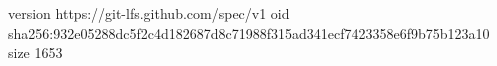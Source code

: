 version https://git-lfs.github.com/spec/v1
oid sha256:932e05288dc5f2c4d182687d8c71988f315ad341ecf7423358e6f9b75b123a10
size 1653
